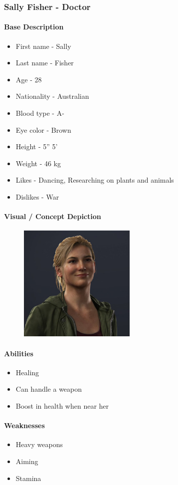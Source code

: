 \subsubsection{\Large Sally Fisher - Doctor}
	\paragraph{\Large Base Description}\mbox{}
		\begin{itemize}
			\item First name - Sally
			\item Last name - Fisher
			\item Age - 28
			\item Nationality - Australian
			\item Blood type - A-
			\item Eye color - Brown
			\item Height - 5” 5’
			\item Weight - 46 kg
			\item Likes - Dancing, Researching on plants and animals
			\item Dislikes - War
		\end{itemize}
	\paragraph{\Large Visual / Concept Depiction}\mbox{}
		\begin{figure}[H]
			\centering
			\includegraphics[width=0.5\textwidth]{images/characters/sally}
		\end{figure}
	\paragraph{\Large Abilities}\mbox{}
		\begin{itemize}
			\item Healing
			\item Can handle a weapon
			\item Boost in health when near her
		\end{itemize}
	\paragraph{\Large Weaknesses}\mbox{}
		\begin{itemize}
			\item Heavy weapons
			\item Aiming
			\item Stamina
		\end{itemize}